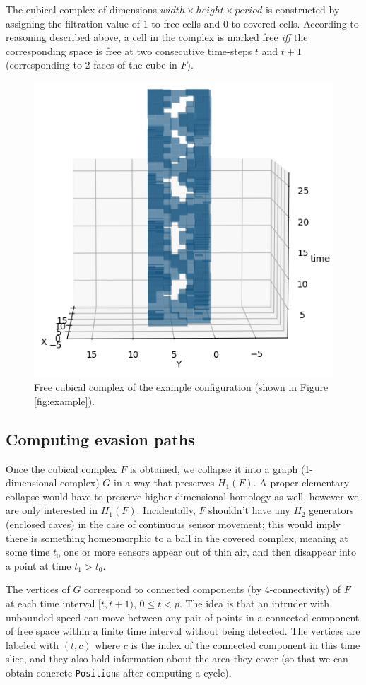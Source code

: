 \documentclass{article}
\begin{document}
The cubical complex of dimensions $ width \times height \times period $ is constructed by assigning the filtration value of $1$ to free cells and $0$ to covered cells.
According to reasoning described above, a cell in the complex is marked free {\it iff} the corresponding space is free at two consecutive time-steps $t$ and $t + 1$ (corresponding to 2 faces of the cube in $F$).

\begin{figure}[H]
  \centering
  \includegraphics[width=0.7\linewidth]{example_cubical_complex.png}
  \caption{Free cubical complex of the example configuration (shown in Figure \ref{fig:example}).}
  \label{fig:example_cub_complex}
\end{figure}


\subsection{Computing evasion paths}

Once the cubical complex $F$ is obtained,
we collapse it into a graph (1-dimensional complex) $G$ in a way that preserves $H_1(F)$.
A proper elementary collapse would have to preserve higher-dimensional homology as well, however we are only interested in $H_1(F)$.
Incidentally, $F$ shouldn't have any $H_2$ generators (enclosed caves) in the case of continuous sensor movement; this would imply there is something homeomorphic to a ball in the covered complex, meaning at some time $t_0$ one or more sensors appear out of thin air, and then disappear into a point at time $t_1 > t_0$.

The vertices of $G$ correspond to connected components (by 4-connectivity) of $F$ at each time interval $[t, t + 1)$, $0 \leq t < p$.
The idea is that an intruder with unbounded speed can move between any pair of points in a connected component of free space within a finite time interval without being detected.
The vertices are labeled with $(t, c)$ where $c$ is the index of the connected component in this time slice,
and they also hold information about the area they cover (so that we can obtain concrete \texttt{Position}s after computing a cycle).
\end{document}
